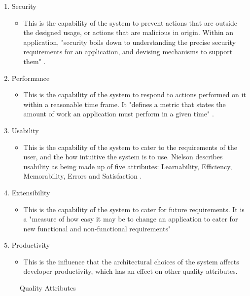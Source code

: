 \begin{enumerate}
\item Security
\begin{itemize}
\item This is the capability of the system to prevent actions that are outside the designed usage, or actions that are malicious in origin. Within an application, "security boils down to understanding the precise security requirements for an application, and devising mechanisms to support them" \parencite{gorton2006essential}.
\end{itemize}
\item Performance
\begin{itemize}
\item This is the capability of the system to respond to actions performed on it within a reasonable time frame. It "defines a metric that states the amount of work an application must perform in a given time" \parencite{gorton2006essential}.
\end{itemize}
\item Usability
\begin{itemize}
\item This is the capability of the system to cater to the requirements of the user, and the how intuitive the system is to use. Nielson describes usability as being made up of five attributes: Learnability, Efficiency, Memorability, Errors and Satisfaction \parencite{usability}.
\end{itemize}
\item Extensibility
\begin{itemize}
\item This is the capability of the system to cater for future requirements. It is a "measure of how easy it may be to change an application to cater for new functional and non-functional requirements" \parencite{gorton2006essential}
\end{itemize}
\item Productivity
\begin{itemize}
\item This is the influence that the architectural choices of the system affects developer productivity, which has an effect on other quality attributes.
\end{itemize}
\end{enumerate}
\begin{figure}[H]
\caption{Quality Attributes}
\label{fig:qualityAttributes}
\end{figure}


